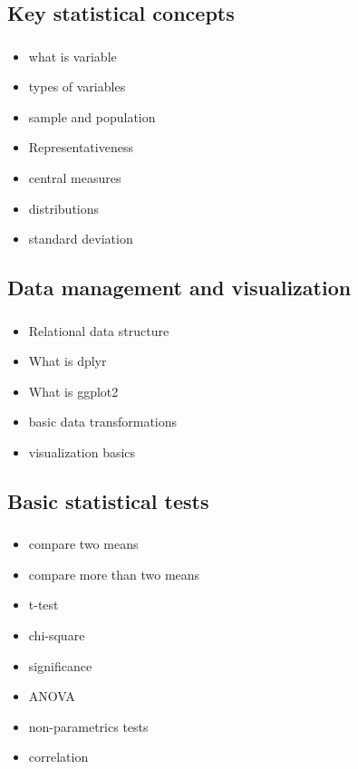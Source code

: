 \documentclass[t, 11pt]{beamer}
\begin{document}
	\subsection{Key statistical concepts}
	\begin{frame}\label{}
		\frametitle{\insertsection}
		\frametitle{\insertsubsection}
		
		\begin{itemize}
			\item what is variable
			\item types of variables
			\item sample and population
			\item Representativeness 
			\item central measures
			\item distributions 
			\item standard deviation
		\end{itemize}	  
	\end{frame}	
	
	
	\subsection{Data management and visualization}
	\begin{frame}\label{}
		\frametitle{\insertsection}
		\frametitle{\insertsubsection}
		
		\begin{itemize}
			\item Relational data structure
			\item What is dplyr
			\item What is ggplot2
			\item basic data transformations
			\item visualization basics
		\end{itemize}	  
	\end{frame}		
	
	\subsection{Basic statistical tests}
	\begin{frame}\label{}
		\frametitle{\insertsection}
		\frametitle{\insertsubsection}
		
		\begin{itemize}
			\item compare two means 
			\item compare more than two means
			\item t-test
			\item chi-square
			\item significance
			\item ANOVA
			\item non-parametrics tests
			\item correlation 
		\end{itemize}	  
	\end{frame}			
	
\end{document}
